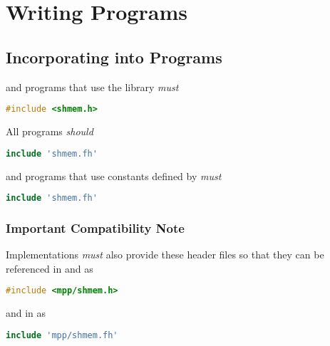 \section{Writing \openshmem{} Programs}

\subsection*{Incorporating \openshmem{} into Programs}




\Clang{} and \Cpp{} programs that use the \openshmem library \emph{must}

\begin{lstlisting}[language=C++]
#include <shmem.h>
\end{lstlisting}

All \Fortran{} \openshmem programs \emph{should}

\begin{lstlisting}[language=Fortran]
include 'shmem.fh'
\end{lstlisting}

and \Fortran{} \openshmem programs that use constants defined by \openshmem
\emph{must}

\begin{lstlisting}[language=Fortran]
include 'shmem.fh'
\end{lstlisting}

\subsubsection*{\textbf{Important Compatibility Note}}

Implementations \emph{must} also provide these header files so that
they can be referenced in \Clang{} and \Cpp{} as

\begin{lstlisting}[language=C++]
#include <mpp/shmem.h>
\end{lstlisting}

and in \Fortran{} as

\begin{lstlisting}[language=Fortran]
include 'mpp/shmem.fh'
\end{lstlisting}

